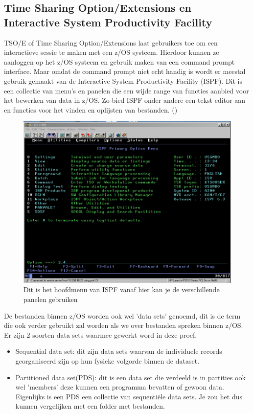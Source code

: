 \subsection{Time Sharing Option/Extensions en Interactive System Productivity Facility}
\label{subsec:Time Sharing Option}

TSO/E of Time Sharing Option/Extensions laat gebruikers toe om een interactieve sessie te maken met een z/OS systeem. Hierdoor kunnen ze aanloggen op het z/OS systeem en gebruik maken van een command prompt interface. Maar omdat de command prompt niet echt handig is wordt er meestal gebruik gemaakt van de Interactive System Productivity Facility (ISPF). Dit is een collectie van menu's en panelen die een wijde range van functies aanbied voor het bewerken van data in z/OS. Zo bied ISPF onder andere een tekst editor aan en functies voor het vinden en oplijsten van bestanden. (\cite{Parziale2017})

\begin{figure}
	\centering
	\includegraphics[width=0.7\linewidth]{img/IPSF}
	\caption[ISPF hoofdmenu]{Dit is het hoofdmenu van ISPF vanaf hier kan je de verschillende panelen gebruiken}
	\label{fig:ispf}
\end{figure}


De bestanden binnen z/OS worden ook wel 'data sets' genoemd, dit is de term die ook verder gebruikt zal worden als we over bestanden spreken binnen z/OS. Er zijn 2 soorten data sets waarmee gewerkt word in deze proef.

\begin{itemize}
	\item Sequential data set: dit zijn data sets waarvan de individuele records georganiseerd zijn op hun fysieke volgorde binnen de dataset.
	\item Partitioned data set(PDS): dit is een data set die verdeeld is in partities ook wel 'members' deze kunnen een programma bevatten of gewoon data. Eigenlijks is een PDS een collectie van sequentiële data sets. Je zou het dus kunnen vergelijken met een folder met bestanden.
\end{itemize}

